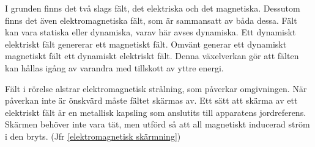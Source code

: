 I grunden finns det två slags fält, det elektriska och det magnetiska.
Dessutom finns det även elektromagnetiska fält, som är sammansatt av båda dessa.
Fält kan vara statiska eller dynamiska, varav här avses dynamiska.
Ett dynamiskt elektriskt fält genererar ett magnetiskt fält.
Omvänt generar ett dynamiskt magnetiskt fält ett dynamiskt elektriskt fält.
Denna växelverkan gör att fälten kan hållas igång av varandra med tillskott av
yttre energi.

Fält i rörelse alstrar elektromagnetisk strålning, som påverkar omgivningen.
När påverkan inte är önskvärd måste fältet skärmas av.
Ett sätt att skärma av ett elektriskt fält är en metallisk kapsling som
anslutits till apparatens jordreferens.
Skärmen behöver inte vara tät, men utförd så att all magnetiskt inducerad ström
i den bryts. (Jfr \ref{elektromagnetisk skärmning})
